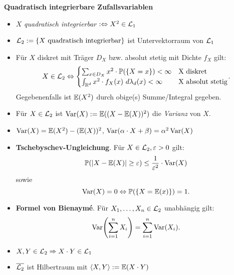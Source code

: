 \textbf{Quadratisch integrierbare Zufallsvariablen}
\begin{itemize}
\item $X$ \textit{quadratisch integrierbar} $:\Leftrightarrow X^2\in\mathcal{L}_1$

\item $\mathcal{L}_2 := \{X \text{ quadratisch integrierbar}\}$ ist Untervektorraum von $\mathcal{L}_1$

\item Für $X$ diskret mit Träger $D_X$ bzw. absolut stetig mit Dichte $f_X$ gilt:
  \[
    X\in\L_2\Leftrightarrow
    \begin{cases}
    \sum_{x \in D_X} x^2 \cdot \Pr(\{X=x\}) < \infty			& \text{X diskret} \\
    \int_{\R^d} x^2\cdot f_X(x)~d\lambda_d(x) < \infty		& \text{X absolut stetig}
    \end{cases}.
  \]
Gegebenenfalls ist $\mathbb{E}(X^2)$ durch obige(s) Summe/Integral gegeben.

\item Für $X\in\mathcal{L}_2$ ist $\operatorname{Var}(X) := \mathbb{E}((X-\mathbb{E}(X))^2)$ die \textit{Varianz} von $X$.

\item $\operatorname{Var}(X) = \mathbb{E}(X^2) - (\mathbb{E}(X))^2$,
  \quad $\operatorname{Var}(\alpha \cdot X + \beta) = \alpha^2\operatorname{Var}(X)$

\item \textbf{Tschebyschev-Ungleichung}. Für $X\in\mathcal{L}_2, \varepsilon > 0$ gilt:
  \[
    \mathbb{P}(|X-\mathbb{E}(X)| \geq \varepsilon) \leq \frac{1}{\varepsilon^2} \cdot \operatorname{Var}(X)
  \]
  sowie
  \[
    \operatorname{Var}(X) = 0 \Leftrightarrow \mathbb{P}(\{X=\mathbb{E}(x)\}) = 1.
  \]

\item \textbf{Formel von Bienaymé}. Für $X_1,\ldots,X_n\in\mathcal{L}_2$ unabhängig gilt:
  \[
    \Var\left(\sum_{i=1}^n X_i\right) = \sum_{i=1}^n \Var(X_i).
  \]

\item $X,Y\in\mathcal{L}_2 \Rightarrow X \cdot Y \in\mathcal{L}_1$

\item $\overline{\mathcal{L}_2}$ ist Hilbertraum mit $\langle X,Y \rangle := \mathbb{E}(X \cdot Y)$
\end{itemize}
\hspace{3em}

